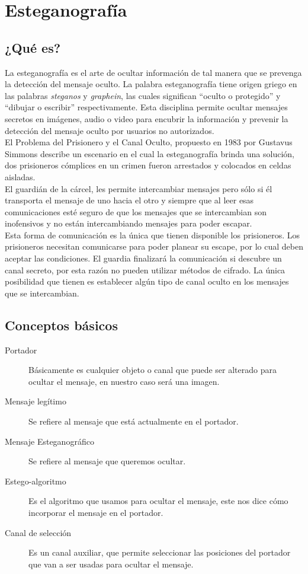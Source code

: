 \documentclass[a4paper]{article}
\begin{document}
\section{Esteganografía}

\subsection{¿Qué es?}

La esteganografía es el arte de ocultar información de tal manera que se prevenga la detección del mensaje oculto. La palabra esteganografía tiene origen griego en las palabras \emph{steganos} y \emph{graphein}, las cuales significan ``oculto o protegido'' y ``dibujar o escribir'' respectivamente.  Esta disciplina permite ocultar mensajes secretos en imágenes, audio o video para encubrir la información y prevenir la detección del mensaje oculto por usuarios no autorizados.\\

El Problema del Prisionero y el Canal Oculto, propuesto en 1983 por Gustavus Simmons describe un escenario en el cual la esteganografía brinda una solución, dos prisioneros cómplices en un crimen fueron arrestados y colocados en celdas aisladas.\\

El guardián de la cárcel, les permite intercambiar mensajes pero sólo si él transporta el mensaje de uno hacia el otro y siempre que al leer esas comunicaciones esté seguro de que los mensajes que se intercambian son inofensivos y no están intercambiando mensajes para poder escapar.\\

Esta forma de comunicación es la única que tienen disponible los prisioneros. Los prisioneros necesitan comunicarse para poder planear su escape, por lo cual deben aceptar las condiciones. El guardia finalizará la comunicación si descubre un canal secreto, por esta razón no pueden utilizar métodos de cifrado. La única posibilidad que tienen es establecer algún tipo de canal oculto en los mensajes que se intercambian. \cite{simmons83}


\subsection{Conceptos básicos}

\begin{description}
\item[Portador] Básicamente es cualquier objeto o canal que puede ser alterado para ocultar el mensaje, en nuestro caso será una imagen.
\item[Mensaje legítimo] Se refiere al mensaje que está actualmente en el portador.
\item[Mensaje Esteganográfico] Se refiere al mensaje que queremos ocultar.
\item[Estego-algoritmo] Es el algoritmo que usamos para ocultar el mensaje, este nos dice cómo incorporar el mensaje en el portador.
\item[Canal de selección] Es un canal auxiliar, que permite seleccionar las posiciones del portador que van a ser usadas para ocultar el mensaje.
\end{description}
\end{document}
